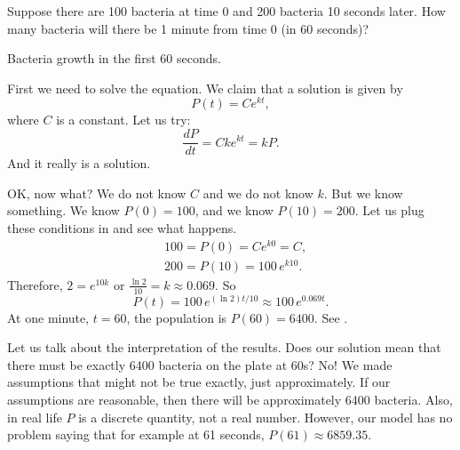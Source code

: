 \begin{example}
Suppose there are 100 bacteria at time 0 and 200 bacteria 10 seconds later.
How many bacteria will there be 1 minute from time 0 (in 60 seconds)?

\begin{mywrapfig}{3.25in}
\capstart
{}
\caption{Bacteria growth in the first 60 seconds.\label{intro:plotbactfig}}
\end{mywrapfig}
%
%
First we need to solve the equation.  We claim that a solution is given by
\begin{equation*}
P(t) = C e^{kt} ,
\end{equation*}
where $C$ is a constant.  Let us try:
\begin{equation*}
\frac{dP}{dt} = C k e^{kt} = k P .
\end{equation*}
And it really is a solution.

OK\@, now what?  We do not know $C$ and we do not know $k$.  But we know
something.  We know $P(0) = 100$, and we know 
$P(10) = 200$.  Let us plug these conditions in and see what happens.
\begin{align*}
& 100 = P(0) = C e^{k0} = C ,\\
& 200 = P(10) = 100 \, e^{k10} .
\end{align*}
Therefore, $2 = e^{10k}$ or $\frac{\ln 2}{10} = k \approx 0.069$.
So 
\begin{equation*}
P(t) = 100 \, e^{(\ln 2) t / 10} \approx 100 \, e^{0.069 t} .
\end{equation*}
At one minute, $t=60$, the population is $P(60) = 6400$.  See
.




Let us talk about the interpretation of the results.  Does our solution
mean that
there must be exactly 6400 bacteria on the plate at 60s?  No!  We made
assumptions that might not be true exactly, just approximately.
If our assumptions are reasonable,
then there will be approximately 6400 bacteria.
Also, in real life $P$ is a
discrete quantity, not a real number.  However, our model has no problem saying
that for example at 61 seconds, $P(61) \approx 6859.35$.
\end{example}

